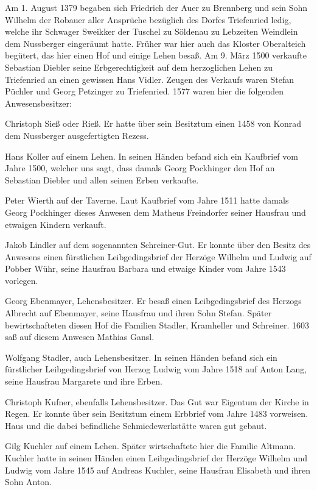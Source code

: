 \documentclass[12pt,a4pager]{book}
\begin{document}
Am 1. August 1379 begaben sich Friedrich der Auer zu Brennberg und sein Sohn
Wilhelm der Robauer aller Ansprüche bezüglich des Dorfes Triefenried ledig,
welche ihr Schwager Sweikker der Tuschel zu Söldenau zu Lebzeiten Weindlein dem
Nussberger eingeräumt hatte. Früher war hier auch das Kloster Oberalteich
begütert, das hier einen Hof und einige Lehen besaß. Am 9. März 1500 verkaufte
Sebastian Diebler seine Erbgerechtigkeit auf dem herzoglichen Lehen zu
Triefenried an einen gewissen Hans Vidler. Zeugen des Verkaufs waren Stefan
Püchler und Georg Petzinger zu Triefenried. 1577 waren hier die folgenden
Anwesensbesitzer:

Christoph Sieß oder Rieß. Er hatte über sein Besitztum einen 1458 von Konrad dem
Nussberger ausgefertigten Rezess.

Hans Koller auf einem Lehen. In seinen Händen befand sich ein Kaufbrief vom
Jahre 1500, welcher uns sagt, dass damals Georg Pockhinger den Hof an Sebastian
Diebler und allen seinen Erben verkaufte.

Peter Wierth auf der Taverne. Laut Kaufbrief vom Jahre 1511 hatte damals Georg
Pockhinger dieses Anwesen dem Matheus Freindorfer seiner Hausfrau und etwaigen
Kindern verkauft.

Jakob Lindler auf dem sogenannten Schreiner-Gut. Er konnte über den Besitz des
Anwesens einen fürstlichen Leibgedingsbrief der Herzöge Wilhelm und Ludwig auf
Pobber Wühr, seine Hausfrau Barbara und etwaige Kinder vom Jahre 1543 vorlegen.

Georg Ebenmayer, Lehensbesitzer. Er besaß einen Leibgedingsbrief des Herzogs
Albrecht auf Ebenmayer, seine Hausfrau und ihren Sohn Stefan. Später
bewirtschafteten diesen Hof die Familien Stadler, Kramheller und Schreiner. 1603
saß auf diesem Anwesen Mathias Gansl.

Wolfgang Stadler, auch Lehensbesitzer. In seinen Händen befand sich ein
fürstlicher Leibgedingsbrief von Herzog Ludwig vom Jahre 1518 auf Anton Lang,
seine Hausfrau Margarete und ihre Erben.

Christoph Kufner, ebenfalls Lehensbesitzer. Das Gut war Eigentum der Kirche in
Regen. Er konnte über sein Besitztum einem Erbbrief vom Jahre 1483 vorweisen.
Haus und die dabei befindliche Schmiedewerkstätte waren gut gebaut.

Gilg Kuchler auf einem Lehen. Später wirtschaftete hier die Familie Altmann.
Kuchler hatte in seinen Händen einen Leibgedingsbrief der Herzöge Wilhelm und
Ludwig vom Jahre 1545 auf Andreas Kuchler, seine Hausfrau Elisabeth und ihren
Sohn Anton.
\end{document}
